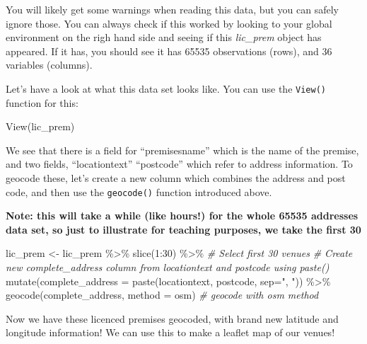 \documentclass[
  krantz2]{krantz}
\makeatletter
\newenvironment{Shaded}{\begin{snugshade}}{\end{snugshade}}
\newcommand{\AttributeTok}[1]{\textcolor[rgb]{0.61,0.61,0.61}{#1}}
\newcommand{\CommentTok}[1]{\textcolor[rgb]{0.37,0.37,0.37}{\textit{#1}}}
\newcommand{\DecValTok}[1]{\textcolor[rgb]{0.06,0.06,0.06}{#1}}
\newcommand{\FunctionTok}[1]{\textcolor[rgb]{0,0,0}{#1}}
\newcommand{\NormalTok}[1]{#1}
\newcommand{\OtherTok}[1]{\textcolor[rgb]{0.37,0.37,0.37}{#1}}
\newcommand{\SpecialCharTok}[1]{\textcolor[rgb]{0,0,0}{#1}}
\newcommand{\StringTok}[1]{\textcolor[rgb]{0.5,0.5,0.5}{#1}}
\newenvironment{kframe}{%
\medskip{}
\setlength{\fboxsep}{.8em}
 \def\at@end@of@kframe{}%
 \ifinner\ifhmode%
  \def\at@end@of@kframe{\end{minipage}}%
  \begin{minipage}{\columnwidth}%
 \fi\fi%
 \def\FrameCommand##1{\hskip\@totalleftmargin \hskip-\fboxsep
 \colorbox{shadecolor}{##1}\hskip-\fboxsep
     \hskip-\linewidth \hskip-\@totalleftmargin \hskip\columnwidth}%
 \MakeFramed {\advance\hsize-\width
   \@totalleftmargin\z@ \linewidth\hsize
   \@setminipage}}%
 {\par\unskip\endMakeFramed%
 \at@end@of@kframe}
\renewenvironment{Shaded}{\begin{kframe}}{\end{kframe}}
\makeatother
\begin{document}
You will likely get some warnings when reading this data, but you can safely ignore those. You can always check if this worked by looking to your global environment on the righ hand side and seeing if this \emph{lic\_prem} object has appeared. If it has, you should see it has 65535 observations (rows), and 36 variables (columns).

Let's have a look at what this data set looks like. You can use the \texttt{View()} function for this:

\begin{Shaded}
\begin{Highlighting}[]
\FunctionTok{View}\NormalTok{(lic\_prem)}
\end{Highlighting}
\end{Shaded}

We see that there is a field for ``premisesname'' which is the name of the premise, and two fields, ``locationtext'' ``postcode'' which refer to address information. To geocode these, let's create a new column which combines the address and post code, and then use the \texttt{geocode()} function introduced above.

\textbf{Note: this will take a while (like hours!) for the whole 65535 addresses data set, so just to illustrate for teaching purposes, we take the first 30}

\begin{Shaded}
\begin{Highlighting}[]
\NormalTok{lic\_prem }\OtherTok{\textless{}{-}}\NormalTok{ lic\_prem }\SpecialCharTok{\%\textgreater{}\%} 
  \FunctionTok{slice}\NormalTok{(}\DecValTok{1}\SpecialCharTok{:}\DecValTok{30}\NormalTok{) }\SpecialCharTok{\%\textgreater{}\%}    \CommentTok{\# Select first 30 venues}
  \CommentTok{\# Create new complete\_address column from locationtext and postcode using paste()}
  \FunctionTok{mutate}\NormalTok{(}\AttributeTok{complete\_address =} \FunctionTok{paste}\NormalTok{(locationtext, }
\NormalTok{                                  postcode, }
                                  \AttributeTok{sep=}\StringTok{", "}\NormalTok{)) }\SpecialCharTok{\%\textgreater{}\%}     
  \FunctionTok{geocode}\NormalTok{(complete\_address, }\AttributeTok{method =} \StringTok{\textquotesingle{}osm\textquotesingle{}}\NormalTok{)  }\CommentTok{\# geocode with osm method}
\end{Highlighting}
\end{Shaded}

Now we have these licenced premises geocoded, with brand new latitude and longitude information! We can use this to make a leaflet map of our venues!
\end{document}
